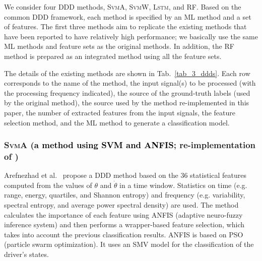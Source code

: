 \documentclass[letterpaper, 10 pt, conference]{ieeeconf}  %
\newcommand{\Ishii}[1]{\textcolor{black}{#1}}
\newcommand{\Impl}[1]{\textsc{#1}}
\begin{document}
We consider four DDD methods, \Impl{SvmA}, \Impl{SvmW}, \Impl{Lstm}, and \Impl{RF}.
%
Based on the common DDD framework, each method is specified by an ML method and a set of features.
The first three methods aim to replicate the existing methods that have been reported to have relatively high performance; we basically use the same ML methods and feature sets as the original methods.
%
%
In addition, the \Impl{RF} method is prepared as an integrated method using all the feature sets.

The details of the existing methods are shown in Tab.~\ref{tab_3_ddds}.
Each row corresponds to the name of the method,
the input signal(s) to be processed (with the processing frequency indicated), 
the source of the ground-truth labels (used by the original method),
the source used by the method re-implemented in this paper,
the number of extracted features from the input signals, the feature selection method, and the ML method to generate a classification model.

\vspace{.5em}

\subsubsection{\Impl{SvmA} (\Ishii{a method using SVM and ANFIS}; re-implementation of \cite{Arefnezhad2019})}

Arefnezhad et al.~\cite{Arefnezhad2019} propose a DDD method based on the 36 statistical features computed from the values of $\theta$ and $\dot{\theta}$ in a time window.
Statistics on time (e.g. range, energy, quartiles, and Shannon entropy) and frequency (e.g. variability, spectral entropy, and average power spectral density) are used.
%
The method calculates the importance of each feature using ANFIS (adaptive neuro-fuzzy inference system) and then performs a wrapper-based feature selection, which takes into account the previous classification results.
ANFIS is based on PSO (particle swarm optimization).
It uses an SMV model for the classification of the driver's states.
\end{document}
